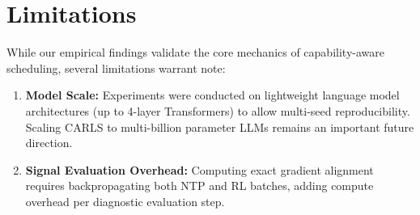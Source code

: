 \section{Limitations}
\label{sec:limitations}

While our empirical findings validate the core mechanics of capability-aware scheduling, several limitations warrant note:
\begin{enumerate}
    \item \textbf{Model Scale:} Experiments were conducted on lightweight language model architectures (up to 4-layer Transformers) to allow multi-seed reproducibility. Scaling CARLS to multi-billion parameter LLMs remains an important future direction.
    \item \textbf{Signal Evaluation Overhead:} Computing exact gradient alignment requires backpropagating both NTP and RL batches, adding compute overhead per diagnostic evaluation step.
\end{enumerate}
